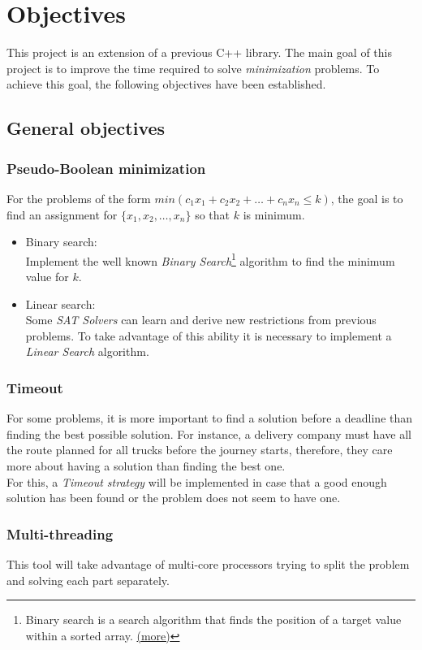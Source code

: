 
\chapter{Objectives} %

\label{Chapter1} %

This project is an extension of a previous C++ library. The main goal of this project is to improve the time required to solve \emph{minimization} problems. To achieve this goal, the following objectives have been established. 

\section{General objectives}

\subsection{Pseudo-Boolean minimization}
For the problems of the form $min(c_{1}x_{1}+c_{2}x_{2}+\ldots +c_{n}x_{n} \leq k)$, the goal is to find an assignment for $\{x_{1},x_{2},\ldots,x_{n}\}$ so that $k$ is minimum.


\begin{itemize}
	\item Binary search:\\
	Implement the well known \emph{Binary Search}\footnote{Binary search is a search algorithm that finds the position of a target value within a sorted array. \href{https://en.wikipedia.org/wiki/Binary_search_algorithm}{(more)}} algorithm to find the minimum value for $k$.
	\item Linear search:\\
	Some \emph{SAT Solvers} can learn and derive new restrictions from previous problems. To take advantage of this ability it is necessary to implement a \emph{Linear Search} algorithm.
\end{itemize}

\subsection{Timeout}
For some problems, it is more important to find a solution before a deadline than finding the best possible solution. For instance, a delivery company must have all the route planned for all trucks before the journey starts, therefore, they care more about having a solution than finding the best one.\\
For this, a \emph{Timeout strategy} will be implemented in case that a good enough solution has been found or the problem does not seem to have one. 
\subsection{Multi-threading}
This tool will take advantage of multi-core processors trying to split the problem and solving each part separately.